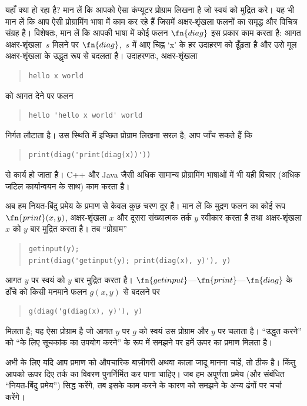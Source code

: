 \documentclass[../../../include/open-logic-section]{subfiles}
\begin{document}
\begin{explain}
यहाँ क्या हो रहा है? मान लें कि आपको ऐसा कंप्यूटर प्रोग्राम लिखना है जो
स्वयं को मुद्रित करे। यह भी मान लें कि आप ऐसी प्रोग्रामिंग भाषा में काम
कर रहे हैं जिसमें अक्षर-शृंखला फलनों का समृद्ध और विचित्र संग्रह है।
विशेषतः, मान लें कि आपकी भाषा में कोई फलन $\fn{diag}$ इस प्रकार काम करता
है: आगत अक्षर-शृंखला~$s$ मिलने पर $\fn{diag}$,~$s$ में आए चिह्न `x' के
हर उदाहरण को ढूँढ़ता है और उसे मूल अक्षर-शृंखला के उद्धृत रूप से बदलता
है। उदाहरणतः, अक्षर-शृंखला
\begin{quote}
\begin{verbatim}
hello x world
\end{verbatim}
\end{quote}
को आगत देने पर फलन
\begin{quote}
\begin{verbatim}
hello 'hello x world' world
\end{verbatim}
\end{quote}
निर्गत लौटाता है। उस स्थिति में इच्छित प्रोग्राम लिखना सरल है; आप जाँच
सकते हैं कि
\begin{quote}
\begin{verbatim}
print(diag('print(diag(x))'))
\end{verbatim}
\end{quote}
से कार्य हो जाता है। C++ और Java जैसी अधिक सामान्य प्रोग्रामिंग भाषाओं
में भी यही विचार (अधिक जटिल कार्यान्वयन के साथ) काम करता है।

अब हम नियत-बिंदु प्रमेय के प्रमाण से केवल कुछ चरण दूर हैं। मान लें कि
मुद्रण फलन का कोई रूप $\fn{print}(x,y)$, अक्षर-शृंखला $x$ और दूसरा
संख्यात्मक तर्क $y$ स्वीकार करता है तथा अक्षर-शृंखला $x$ को $y$ बार
मुद्रित करता है। तब ``प्रोग्राम''
\begin{quote}
\begin{verbatim}
getinput(y);
print(diag('getinput(y); print(diag(x), y)'), y)
\end{verbatim}
\end{quote}
आगत $y$ पर स्वयं को $y$ बार मुद्रित करता है।
$\fn{getinput}$---$\fn{print}$---$\fn{diag}$ के ढाँचे को किसी मनमाने
फलन $g(x,y)$ से बदलने पर
\begin{quote}
\begin{verbatim}
g(diag('g(diag(x), y)'), y)
\end{verbatim}
\end{quote}
मिलता है; यह ऐसा प्रोग्राम है जो आगत $y$ पर $g$ को स्वयं उस प्रोग्राम
और $y$ पर चलाता है। ``उद्धृत करने'' को ``के लिए सूचकांक का उपयोग करने'' के रूप
में समझने पर हमें ऊपर का प्रमाण मिलता है।

अभी के लिए यदि आप प्रमाण को औपचारिक बाज़ीगरी अथवा काला जादू मानना चाहें,
तो ठीक है। किंतु आपको ऊपर दिए तर्क का विवरण पुनर्निर्मित कर पाना चाहिए।
जब हम अपूर्णता प्रमेय (और संबंधित ``नियत-बिंदु प्रमेय'') सिद्ध करेंगे,
तब इसके काम करने के कारण को समझने के अन्य ढंगों पर चर्चा करेंगे।
\end{explain}
\end{document}
